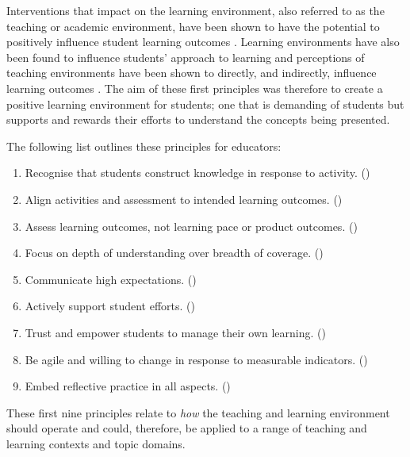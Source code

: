 Interventions that impact on the learning environment, also referred to as the teaching or academic environment, have been shown to have the potential to positively influence student learning outcomes \cite{Trigwell:1991}. Learning environments have also been found to influence students' approach to learning \cite{Entwistle:1990,Entwistle:1991,Kember:2007} and perceptions of teaching environments have been shown to directly, and indirectly, influence learning outcomes \cite{Meyer:1990,Lizzio:2002}. The aim of these first principles was therefore to create a positive learning environment for students; one that is demanding of students but supports and rewards their efforts to understand the concepts being presented. 

The following list outlines these principles for educators:
\begin{enumerate}
	\item Recognise that students construct knowledge in response to activity. ()
	\item Align activities and assessment to intended learning outcomes. ()
	\item Assess learning outcomes, not learning pace or product outcomes. ()
	\item Focus on depth of understanding over breadth of coverage. ()
	\item Communicate high expectations. ()
	\item Actively support student efforts. ()
	\item Trust and empower students to manage their own learning. ()
	\item Be agile and willing to change in response to measurable indicators. ()
	\item Embed reflective practice in all aspects. ()
\end{enumerate}

These first nine principles relate to \emph{how} the teaching and learning environment should operate and could, therefore, be applied to a range of teaching and learning contexts and topic domains.


